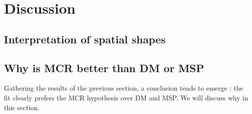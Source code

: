 \chapter{Discussion}
\label{ch:discussion}


%	

\section{Interpretation of spatial shapes}
%		



\section{Why is MCR better than DM or MSP}
%

Gathering the results of the previous section, a conclusion tends to emerge : the fit clearly prefers the MCR hypothesis over DM and MSP. We will discuss why in this section.

